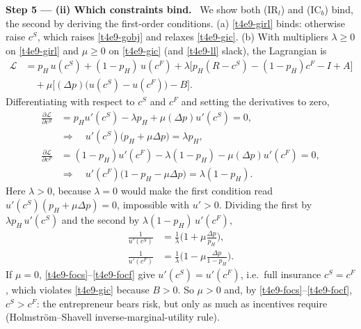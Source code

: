 \documentclass[11pt,a4paper]{article}
\newcommand{\step}[2]{\par\medskip\noindent\textbf{Step #1 --- #2.}~}
\begin{document}
\step{5}{(ii) Which constraints bind} We show both (IR$_l$) and (IC$_b$) bind, the second by
deriving the first-order conditions. (a) \eqref{t4e9-girl} binds: otherwise raise $c^S$, which raises
\eqref{t4e9-gobj} and relaxes \eqref{t4e9-gic}. (b) With multipliers
$\lambda\ge0$ on \eqref{t4e9-girl} and $\mu\ge0$ on \eqref{t4e9-gic} (and \eqref{t4e9-ll} slack), the
Lagrangian is
\begin{align}
  \mathcal L &= p_H\,u(c^S)+(1-p_H)\,u(c^F)+\lambda\big[p_H(R-c^S)-(1-p_H)c^F-I+A\big] \nonumber\\
             &\quad+\mu\big[(\Delta p)\big(u(c^S)-u(c^F)\big)-B\big]. \nonumber
\end{align}
Differentiating with respect to $c^S$ and $c^F$ and setting the derivatives to zero,
\begin{align}
  \frac{\partial\mathcal L}{\partial c^S} &= p_Hu'(c^S)-\lambda p_H+\mu(\Delta p)u'(c^S)=0, \nonumber\\
  &\Longrightarrow\quad u'(c^S)\big(p_H+\mu\Delta p\big)=\lambda p_H, \nonumber\\
  \frac{\partial\mathcal L}{\partial c^F} &= (1-p_H)u'(c^F)-\lambda(1-p_H)-\mu(\Delta p)u'(c^F)=0, \nonumber\\
  &\Longrightarrow\quad u'(c^F)\big(1-p_H-\mu\Delta p\big)=\lambda(1-p_H). \nonumber
\end{align}
Here $\lambda>0$, because $\lambda=0$ would make the first condition read $u'(c^S)(p_H+\mu\Delta p)=0$,
impossible with $u'>0$. Dividing the first by $\lambda p_H\,u'(c^S)$ and the second by
$\lambda(1-p_H)\,u'(c^F)$,
\begin{align}
  \frac{1}{u'(c^S)} &= \frac{1}{\lambda}\Big(1+\mu\frac{\Delta p}{p_H}\Big), \label{t4e9-focs}\\
  \frac{1}{u'(c^F)} &= \frac{1}{\lambda}\Big(1-\mu\frac{\Delta p}{1-p_H}\Big). \label{t4e9-focf}
\end{align}
If $\mu=0$, \eqref{t4e9-focs}--\eqref{t4e9-focf} give $u'(c^S)=u'(c^F)$, i.e.\ full insurance
$c^S=c^F$, which violates \eqref{t4e9-gic} because $B>0$. So $\mu>0$ and, by \eqref{t4e9-focs}--\eqref{t4e9-focf},
$c^S>c^F$: the entrepreneur bears risk, but only as much as incentives require
(Holmstr\"om--Shavell inverse-marginal-utility rule).
\end{document}
